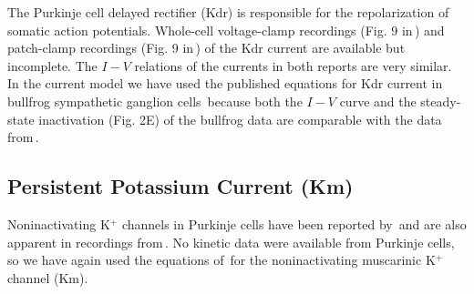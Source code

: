 \documentclass[12pt]{article}
\begin{document}
The Purkinje cell delayed rectifier (Kdr) is responsible for the repolarization of somatic action potentials. Whole-cell voltage-clamp recordings (Fig. 9 in\,\cite{Hirano:1989uq}) and patch-clamp recordings (Fig. 9 in\,\cite{Gahwiler:1989fk}) of the Kdr current are available but incomplete. The $I-V$ relations of the currents in both reports are very similar. In the current model we have used the published equations for Kdr current in bullfrog sympathetic ganglion cells\,\cite{Yamada-W:1989bs} because both the $I-V$ curve and the steady-state inactivation (Fig. 2E) of the bullfrog data are comparable with the data from\,\cite{Hirano:1989uq}.

\subsection*{Persistent Potassium Current (Km)}

Noninactivating K$^+$ channels in Purkinje cells have been reported by\,\cite{Bossu:1989kl} and are also apparent in recordings from\,\cite{Hirano:1989uq}. No kinetic data were available from Purkinje cells, so we have again used the equations of\,\cite{Yamada-W:1989bs} for the noninactivating muscarinic K$^+$ channel (Km).



\end{document}
